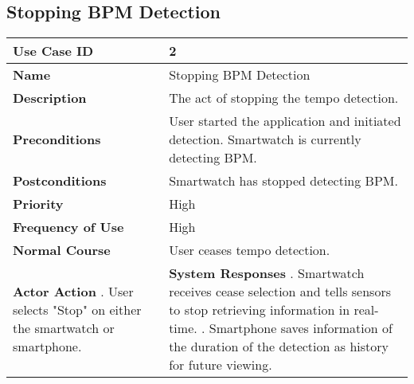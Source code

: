 \documentclass[12pt]{article}
\begin{document}
\subsection{Stopping BPM Detection}
\begin{center}
  \begin{tabular}{ |p{2.5in}|p{3in}| }
  \hline
  \textbf{Use Case ID} & 2 \\[.25in] 
  \hline
  \textbf{Name} & Stopping BPM Detection \\[.25in] 
  \hline 
  \textbf{Description} & The act of stopping the tempo detection. \\[.25in] 
  \hline 
  \textbf{Preconditions} & User started the application and initiated detection. Smartwatch is currently detecting BPM. \\
  \hline
  \textbf{Postconditions} & Smartwatch has stopped detecting BPM. \\[.25in] 
  \hline
  \textbf{Priority} & High \\[.25in] 
  \hline 
  \textbf{Frequency of Use} & High \\[.25in] 
  \hline 
  \textbf{Normal Course} & User ceases tempo detection. \\[.25in] 
  \hline 
  \textbf{Actor Action} \newline \newline 
  1. User selects "Stop" on either the smartwatch or smartphone.
  & \textbf{System Responses} \newline \newline
  2. Smartwatch receives cease selection and tells sensors to stop retrieving information in real-time. \newline
  3. Smartphone saves information of the duration of the detection as history for future viewing. \\[.25in] 
  \hline
  \end{tabular}
\end{center}
  
\end{document}
